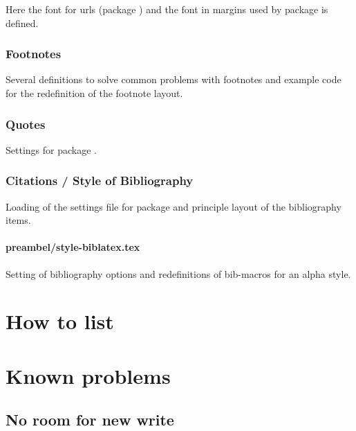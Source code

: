 Here the font for urls (package ) and the font in margins used by package  is defined.


\subsection{Footnotes}

Several definitions to solve common problems with footnotes and example code for the redefinition of the footnote layout.


\subsection{Quotes}

Settings for package .


\subsection{Citations / Style of Bibliography}

Loading of the settings file for package   and principle layout of the bibliography items.


\subsubsection{preambel/style-biblatex.tex}

Setting of bibliography options and redefinitions of bib-macros for an alpha style.



\chapter{How to list}

\chapter{Known problems}

\section{No room for new write}
\label{sec:problems:write}